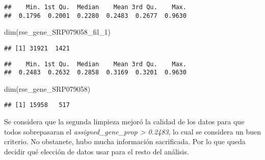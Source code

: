 \documentclass[
]{article}
\newenvironment{Shaded}{\begin{snugshade}}{\end{snugshade}}
\newcommand{\FunctionTok}[1]{\textcolor[rgb]{0.00,0.00,0.00}{#1}}
\newcommand{\NormalTok}[1]{#1}
\newcommand{\SpecialCharTok}[1]{\textcolor[rgb]{0.00,0.00,0.00}{#1}}
\begin{document}
\begin{Shaded}
\end{Shaded}

\begin{verbatim}
##    Min. 1st Qu.  Median    Mean 3rd Qu.    Max. 
##  0.1796  0.2001  0.2280  0.2483  0.2677  0.9630
\end{verbatim}

\begin{Shaded}
\begin{Highlighting}[]
\FunctionTok{dim}\NormalTok{(rse\_gene\_SRP079058\_fil\_1)}
\end{Highlighting}
\end{Shaded}

\begin{verbatim}
## [1] 31921  1421
\end{verbatim}

\begin{Shaded}
\end{Shaded}

\begin{verbatim}
##    Min. 1st Qu.  Median    Mean 3rd Qu.    Max. 
##  0.2483  0.2632  0.2858  0.3169  0.3201  0.9630
\end{verbatim}

\begin{Shaded}
\begin{Highlighting}[]
\FunctionTok{dim}\NormalTok{(rse\_gene\_SRP079058)}
\end{Highlighting}
\end{Shaded}

\begin{verbatim}
## [1] 15958   517
\end{verbatim}

Se considera que la segunda limpieza mejoró la calidad de los datos para
que todos sobrepasaran el \emph{assigned\_gene\_prop \textgreater{}
0.2483}, lo cual se considera un buen criterio. No obstanete, hubo mucha
información sacrificada. Por lo que queda decidir qué elección de datos
usar para el resto del análisis.
\end{document}
